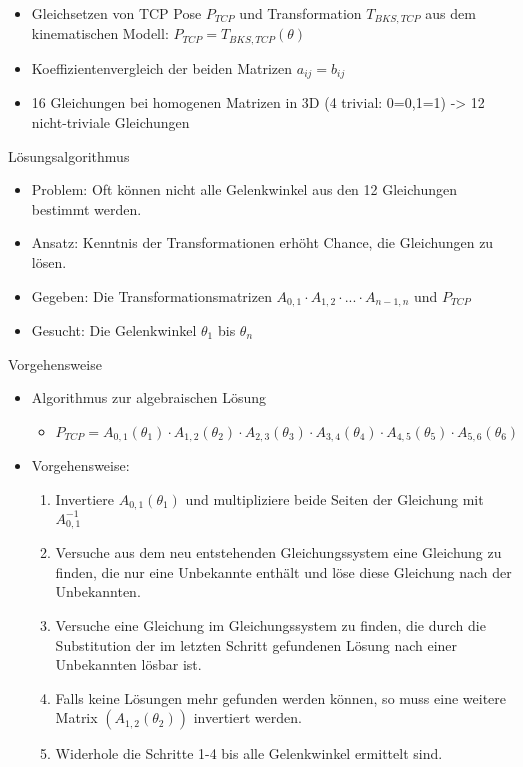 \documentclass[paper=a4, fontsize=11pt]{scrartcl} %
\numberwithin{equation}{section} %
\numberwithin{figure}{section} %
\numberwithin{table}{section} %
\begin{document}
\begin{itemize}
\item Gleichsetzen von TCP Pose $P_{TCP}$ und Transformation $T_{BKS,TCP}$ aus dem kinematischen Modell: $P_{TCP} = T_{BKS,TCP}(\theta)$
\item Koeffizientenvergleich der beiden Matrizen $a_{ij} = b_{ij}$
\item 16 Gleichungen bei homogenen Matrizen in 3D (4 trivial: 0=0,1=1) -> 12 nicht-triviale Gleichungen
\end{itemize}

Lösungsalgorithmus
\begin{itemize}
\item Problem: Oft können nicht alle Gelenkwinkel aus den 12 Gleichungen bestimmt werden.
\item Ansatz: Kenntnis der Transformationen erhöht Chance, die Gleichungen zu lösen.
\item Gegeben: Die Transformationsmatrizen $A_{0,1} \cdot A_{1,2} \cdot ... \cdot A_{n-1,n}$ und $P_{TCP}$
\item Gesucht: Die Gelenkwinkel $\theta_1$ bis $\theta_n$
\end{itemize}

Vorgehensweise
\begin{itemize}
\item Algorithmus zur algebraischen Lösung
\begin{itemize}
\item $P_{TCP} = A_{0,1}(\theta_1) \cdot A_{1,2}(\theta_2) \cdot A_{2,3}(\theta_3) \cdot A_{3,4}(\theta_4) \cdot A_{4,5}(\theta_5) \cdot A_{5,6}(\theta_6)$
\end{itemize}
\item Vorgehensweise:
\begin{enumerate}
\item Invertiere $A_{0,1}(\theta_1)$ und multipliziere beide Seiten der Gleichung mit $A_{0,1}^{-1}$
\item Versuche aus dem neu entstehenden Gleichungssystem eine Gleichung zu finden, die nur eine Unbekannte enthält und löse diese Gleichung nach der Unbekannten.
\item Versuche eine Gleichung im Gleichungssystem zu finden, die durch die Substitution der im letzten Schritt gefundenen Lösung nach einer Unbekannten lösbar ist.
\item Falls keine Lösungen mehr gefunden werden können, so muss eine weitere Matrix $(A_{1,2}(\theta_2))$ invertiert werden.
\item Widerhole die Schritte 1-4 bis alle Gelenkwinkel ermittelt sind.
\end{enumerate}
\end{itemize}
\end{document}
